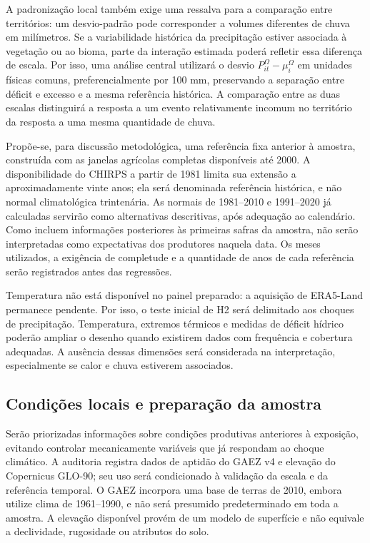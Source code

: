 A padronização local também exige uma ressalva para a comparação entre territórios: um desvio-padrão pode corresponder a volumes diferentes de chuva em milímetros. Se a variabilidade histórica da precipitação estiver associada à vegetação ou ao bioma, parte da interação estimada poderá refletir essa diferença de escala. Por isso, uma análise central utilizará o desvio $P^{\Omega}_{it}-\mu_i^{\Omega}$ em unidades físicas comuns, preferencialmente por 100 mm, preservando a separação entre déficit e excesso e a mesma referência histórica. A comparação entre as duas escalas distinguirá a resposta a um evento relativamente incomum no território da resposta a uma mesma quantidade de chuva.

Propõe-se, para discussão metodológica, uma referência fixa anterior à amostra, construída com as janelas agrícolas completas disponíveis até 2000. A disponibilidade do CHIRPS a partir de 1981 limita sua extensão a aproximadamente vinte anos; ela será denominada referência histórica, e não normal climatológica trintenária. As normais de 1981--2010 e 1991--2020 já calculadas servirão como alternativas descritivas, após adequação ao calendário. Como incluem informações posteriores às primeiras safras da amostra, não serão interpretadas como expectativas dos produtores naquela data. Os meses utilizados, a exigência de completude e a quantidade de anos de cada referência serão registrados antes das regressões.

Temperatura não está disponível no painel preparado: a aquisição de ERA5-Land permanece pendente. Por isso, o teste inicial de H2 será delimitado aos choques de precipitação. Temperatura, extremos térmicos e medidas de déficit hídrico poderão ampliar o desenho quando existirem dados com frequência e cobertura adequadas. A ausência dessas dimensões será considerada na interpretação, especialmente se calor e chuva estiverem associados.

\subsection{Condições locais e preparação da amostra}

Serão priorizadas informações sobre condições produtivas anteriores à exposição, evitando controlar mecanicamente variáveis que já respondam ao choque climático. A auditoria registra dados de aptidão do GAEZ v4 e elevação do Copernicus GLO-90; seu uso será condicionado à validação da escala e da referência temporal. O GAEZ incorpora uma base de terras de 2010, embora utilize clima de 1961--1990, e não será presumido predeterminado em toda a amostra. A elevação disponível provém de um modelo de superfície e não equivale a declividade, rugosidade ou atributos do solo.

